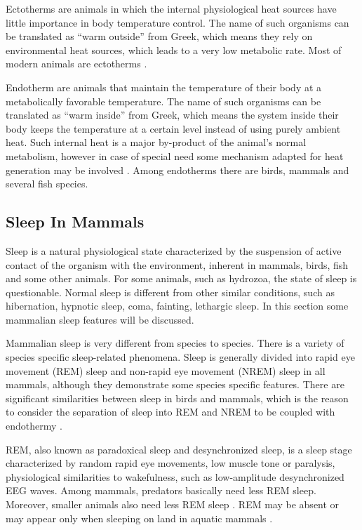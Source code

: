 \documentclass[14pt,a4paper]{scrartcl}
\begin{document}
Ectotherms are animals in which the internal physiological heat sources have little importance in body temperature control. The name of such organisms can be translated as “warm outside” from Greek, which means they rely on environmental heat sources, which leads to a very low metabolic rate. Most of modern animals are ectotherms \cite{Bale2006}.

Endotherm are animals that maintain the temperature of their body at a metabolically favorable temperature. The name of such organisms can be translated as “warm inside” from Greek, which means the system inside their body keeps the temperature at a certain level instead of using purely ambient heat. Such internal heat is a major by-product of the animal’s normal metabolism, however in case of special need some mechanism adapted for heat generation may be involved \cite{Refinetti1992}. Among endotherms there are birds, mammals and several fish species. 



\subsection{Sleep In Mammals}
\label{sec:Introduction:Sleep In Mammals}

Sleep is a natural physiological state characterized by the suspension of active contact of the organism with the environment, inherent in mammals, birds, fish and some other animals. For some animals, such as hydrozoa, the state of sleep is questionable. Normal sleep is different from other similar conditions, such as hibernation, hypnotic sleep, coma, fainting, lethargic sleep. In this section some mammalian sleep features will be discussed.

Mammalian sleep is very different from species to species. There is a variety of species specific sleep-related phenomena. Sleep is generally divided into rapid eye movement (REM) sleep and non-rapid eye movement (NREM) sleep in all mammals, although they demonstrate some species specific features. There are significant similarities between sleep in birds and mammals, which is the reason to consider the separation of sleep into REM and NREM to be coupled with endothermy \citep{Kavanau2002}. 

REM, also known as paradoxical sleep and desynchronized sleep, is a sleep stage characterized by random rapid eye movements, low muscle tone or paralysis, physiological similarities to wakefulness, such as low-amplitude desynchronized EEG waves. Among mammals, predators basically need less REM sleep. Moreover, smaller animals also need less REM sleep \cite{Parmeggiani2012}. REM may be absent or may appear only when sleeping on land in aquatic mammals \cite{Fox2018}.
\end{document}
